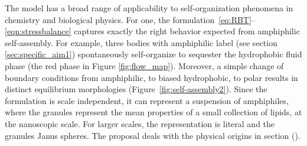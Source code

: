 The model has a broad range of applicability to self-organization
phenomena in chemistry and biological physics. For one,
the formulation~\eqref{eq:RBT}--\eqref{eqn:stressbalance} captures
exactly the right behavior expected from amphiphilic self-assembly.
For example, three bodies with amphiphilic label
(see section \ref{sec:specific_aim1}) spontaneously
self-organize to sequester the hydrophobic fluid phase
(the red phase in Figure \ref{fig:flow_map}).
Moreover, a simple change of boundary conditions from
amphiphilic, to biased hydrophobic, to polar results in distinct
equilibrium morphologies (Figure~\ref{fig:self-assembly2}).
Since the formulation is
scale independent, it can represent a suspension of amphiphiles, where
the granules represent the mean properties of a small collection of
lipids, at the nanoscopic scale. For larger scales, the representation
is literal and the granules Janus spheres. The proposal deals with the
physical origins in section ().

